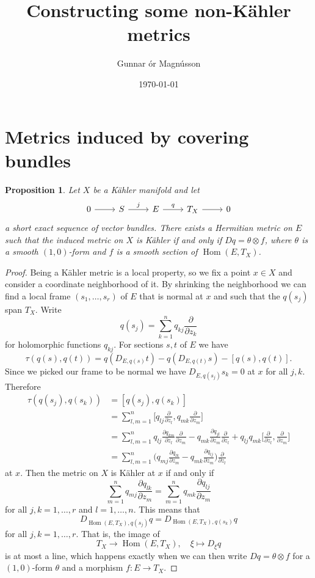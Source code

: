 \documentclass[12pt]{amsart}
\author{Gunnar \TH\'or Magn\'usson}
\date{\today}
\title{Constructing some non-K\"ahler metrics}
\newtheorem{prop}[theo]{Proposition}
\theoremstyle{definition}
\DeclareMathOperator{\Hom}{Hom}
\begin{document}
\maketitle




\section{Metrics induced by covering bundles}


\begin{prop}
Let $X$ be a K\"ahler manifold and let
\[
\begin{tikzcd}
0 \ar[r] &
S \ar[r,"j"] &
E \ar[r,"q"] &
T_X \ar[r] &
0
\end{tikzcd}
\]
a short exact sequence of vector bundles.
There exists a Hermitian metric on $E$ such that the induced metric on $X$ is K\"ahler if and only if $Dq = \theta \otimes f$, where $\theta$ is a smooth $(1,0)$-form and $f$ is a smooth section of $\Hom(E,T_X)$.
\end{prop}



\begin{proof}
Being a K\"ahler metric is a local property, so we fix a point $x \in X$ and consider a coordinate neighborhood of it.
By shrinking the neighborhood we can find a local frame $(s_1, \ldots, s_r)$ of $E$ that is normal at $x$ and such that the $q(s_j)$ span $T_X$.
Write
\[
q(s_j) = \sum_{k=1}^n q_{kj} \frac{\partial}{\partial z_k}
\]
for holomorphic functions $q_{kj}$.
For sections $s,t$ of $E$ we have
\[
\tau(q(s), q(t))
= q(D_{E,q(s)} t) - q(D_{E,q(t)} s) - [q(s), q(t)].
\]
Since we picked our frame to be normal we have $D_{E,q(s_j)} s_k = 0$ at $x$ for all $j,k$.
Therefore
\begin{align*}
\tau(q(s_j), q(s_k))
&= [q(s_j), q(s_k)]
\\
&= \sum_{l,m=1}^n 
\biggl[
q_{lj} \frac{\partial}{\partial z_l},
q_{mk} \frac{\partial}{\partial z_m}
\biggr]
\\
&= \sum_{l,m=1}^n 
q_{lj} \frac{\partial q_{km}}{\partial z_l} \frac{\partial}{\partial z_m}
- q_{mk} \frac{\partial q_{jl}}{\partial z_m} \frac{\partial}{\partial z_l}
+ q_{lj} q_{mk} 
\biggl[
\frac{\partial}{\partial z_l},
\frac{\partial}{\partial z_m}
\biggr]
\\
&= \sum_{l,m=1}^n 
\biggl(
q_{mj} \frac{\partial q_{lk}}{\partial z_m}
- q_{mk} \frac{\partial q_{lj}}{\partial z_m}
\biggr)
\frac{\partial}{\partial z_l}
\end{align*}
at $x$.
Then the metric on $X$ is K\"ahler at $x$ if and only if
\[
\sum_{m=1}^n q_{mj} \frac{\partial q_{lk}}{\partial z_m}
= \sum_{m=1}^n q_{mk} \frac{\partial q_{lj}}{\partial z_m}
\]
for all $j,k = 1,\ldots,r$ and $l = 1,\ldots,n$.
This means that
\[
D_{\Hom(E,T_X),q(s_j)} q = D_{\Hom(E,T_X),q(s_k)} q
\]
for all $j,k = 1,\ldots,r$.
That is, the image of 
\[
T_X \to \Hom(E,T_X),
\quad
\xi \mapsto D_\xi q
\]
is at most a line, which happens exactly when we can then write $Dq = \theta \otimes f$ for a $(1,0)$-form $\theta$ and a morphism $f : E \to T_X$.
\end{proof}
\end{document}
